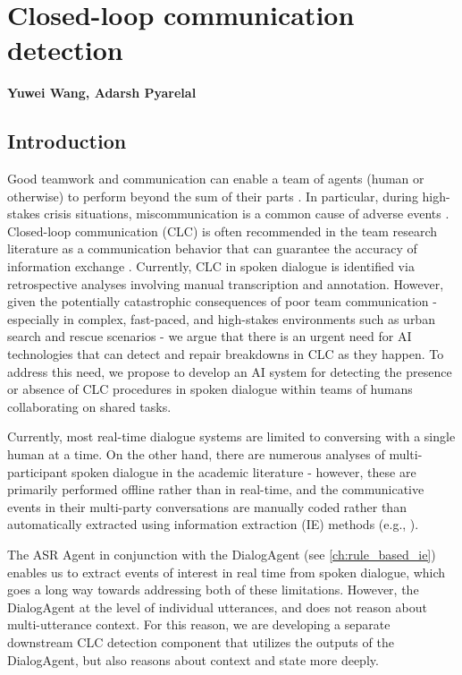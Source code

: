 \chapter{Closed-loop communication detection}
\label{ch:clc}
\textbf{Yuwei Wang, Adarsh Pyarelal}

\section{Introduction}

Good teamwork and communication can enable a team of agents (human or
otherwise) to perform beyond the sum of their parts \cite{roberts2022state}.
In particular, during high-stakes crisis situations, miscommunication is a
common cause of adverse events \cite{taylor2014description,
davis2017operative}. Closed-loop communication (CLC) is often recommended in
the team research literature as a communication behavior that can guarantee the
accuracy of information exchange \cite{marzuki2019closed}. Currently, CLC in
spoken dialogue is identified via retrospective analyses involving manual
transcription and annotation. However, given the potentially catastrophic
consequences of poor team communication \cite{flin2004identifying} - especially
in complex, fast-paced, and high-stakes environments such as urban search and
rescue scenarios - we argue that there is an urgent need for AI technologies
that can detect and repair breakdowns in CLC as they happen. To address this
need, we propose to develop an AI system for detecting the presence or absence
of CLC procedures in spoken dialogue within teams of humans collaborating on
shared tasks.

Currently, most real-time dialogue systems are limited to conversing with a
single human at a time. On the other hand, there are numerous analyses of
multi-participant spoken dialogue in the academic literature - however, these
are primarily performed offline rather than in real-time, and the communicative
events in their multi-party conversations are manually coded rather than
automatically extracted using information extraction (IE) methods (e.g.,
\citep{jagannath2022speech}).

The ASR Agent in conjunction with the DialogAgent (see \autoref{ch:rule_based_ie})
enables us to extract events of interest in real time from spoken dialogue,
which goes a long way towards addressing both of these limitations. However,
the DialogAgent at the level of individual utterances, and does not reason
about multi-utterance context. For this reason, we are developing a separate downstream
CLC detection component that utilizes the outputs of the DialogAgent, but also
reasons about context and state more deeply.

